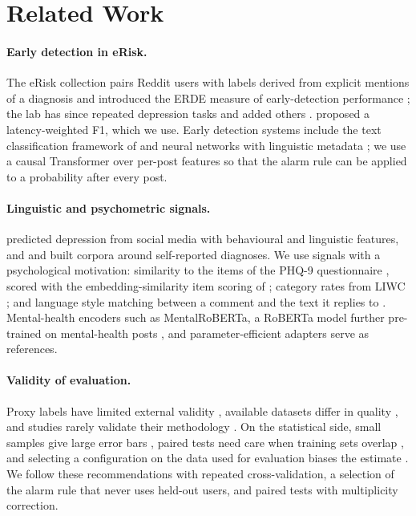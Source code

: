 \documentclass[11pt]{article}
\begin{document}
\section{Related Work}

\paragraph{Early detection in eRisk.}
The eRisk collection pairs Reddit users with labels derived from explicit mentions of a diagnosis and introduced the ERDE measure of early-detection performance \citep{losada2016test}; the lab has since repeated depression tasks and added others \citep{losada2017erisk,losada2018overview,parapar2022overview,parapar2025overview}.
\citet{sadeque2018measuring} proposed a latency-weighted F1, which we use.
Early detection systems include the text classification framework of \citet{burdisso2019text} and neural networks with linguistic metadata \citep{trotzek2020utilizing}; we use a causal Transformer over per-post features so that the alarm rule can be applied to a probability after every post.

\paragraph{Linguistic and psychometric signals.}
\citet{decho2013predicting} predicted depression from social media with behavioural and linguistic features, and \citet{coppersmith-etal-2014-quantifying} and \citet{yates-etal-2017-depression} built corpora around self-reported diagnoses.
We use signals with a psychological motivation: similarity to the items of the PHQ-9 questionnaire \citep{kroenke2001phq}, scored with the embedding-similarity item scoring of \citet{lahnala2025unifying}; category rates from LIWC \citep{pennebaker2015liwc}; and language style matching between a comment and the text it replies to \citep{ireland2010language}.
Mental-health encoders such as MentalRoBERTa, a RoBERTa model \citep{liu2019roberta} further pre-trained on mental-health posts \citep{ji-etal-2022-mentalbert}, and parameter-efficient adapters \citep{houlsby2019parameter,pfeiffer-etal-2020-adapterhub,poth-etal-2023-adapters} serve as references.

\paragraph{Validity of evaluation.}
Proxy labels have limited external validity \citep{ernala2019methodological,harrigian-etal-2020-models}, available datasets differ in quality \citep{harrigian-etal-2021-state}, and studies rarely validate their methodology \citep{chancellor2020methods}.
On the statistical side, small samples give large error bars \citep{varoquaux2018cross}, paired tests need care when training sets overlap \citep{dietterich1998approximate,nadeau2003inference,demsar2006statistical}, and selecting a configuration on the data used for evaluation biases the estimate \citep{cawley2010overfitting}.
We follow these recommendations with repeated cross-validation, a selection of the alarm rule that never uses held-out users, and paired tests with multiplicity correction.
\end{document}
